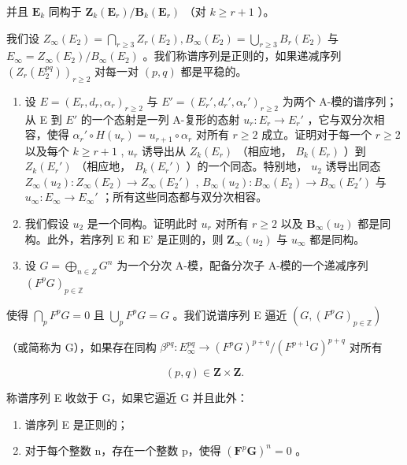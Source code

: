 并且 \(\mathbf{E}_k\) 同构于 \(\mathbf{Z}_k(\mathbf{E}_r) / \mathbf{B}_k(\mathbf{E}_r)\) （对 \(k\geqslant r + 1\) ）。

我们设 \(Z_{\infty}(E_2) = \bigcap_{r \geqslant 3} Z_r(E_2), B_{\infty}(E_2) = \bigcup_{r \geqslant 3} B_r(E_2)\) 与 \(E_{\infty} = Z_{\infty}(E_2)/B_{\infty}(E_2)\) 。我们称谱序列是正则的，如果递减序列 \((Z_r(E_2^{pq}))_{r \geqslant 2}\) 对每一对 \((p, q)\) 都是平稳的。

\begin{enumerate}
\def\labelenumi{\alph{enumi})}
\setcounter{enumi}{1}
\item
  设 \(E = (E_r, d_r, \alpha_r)_{r \geqslant 2}\) 与 \(E' = (E_r', d_r', \alpha_r')_{r \geqslant 2}\) 为两个 A-模的谱序列；从 E 到 \(E'\) 的一个态射是一列 A-复形的态射 \(u_r : E_r \to E_r'\) ，它与双分次相容，使得 \(\alpha_r' \circ H(u_r) = u_{r+1} \circ \alpha_r\) 对所有 \(r \geqslant 2\) 成立。证明对于每一个 \(r \geqslant 2\) 以及每个 \(k \geqslant r + 1\) , \(u_r\) 诱导出从 \(Z_k(E_r)\) （相应地， \(B_k(E_r)\) ）到 \(Z_k(E_r')\) （相应地， \(B_k(E_r')\) ）的一个同态。特别地， \(u_2\) 诱导出同态 \(Z_\infty(u_2) : Z_\infty(E_2) \to Z_\infty(E_2')\) , \(B_\infty(u_2) : B_\infty(E_2) \to B_\infty(E_2')\) 与 \(u_\infty : E_\infty \to E_\infty'\) ；所有这些同态都与双分次相容。
\item
  我们假设 \(u_2\) 是一个同构。证明此时 \(u_r\) 对所有 \(r \geqslant 2\) 以及 \(\mathbf{B}_{\infty}(u_2)\) 都是同构。此外，若序列 E 和 E' 是正则的，则 \(\mathbf{Z}_{\infty}(u_2)\) 与 \(u_{\infty}\) 都是同构。
\item
  设 \(G = \bigoplus_{n \in Z} G^n\) 为一个分次 A-模，配备分次子 A-模的一个递减序列 \((F^p G)_{p \in \mathbb{Z}}\)
\end{enumerate}

使得 \(\bigcap_{p} F^{p} G = 0\) 且 \(\bigcup_{p} F^{p} G = G\) 。我们说谱序列 E 逼近 \((G, (F^{p} G)_{p \in \mathbb{Z}})\)

（或简称为 G），如果存在同构 \(\beta^{pq}: E_{\infty}^{pq} \to (F^p G)^{p+q}/(F^{p+1} G)^{p+q}\) 对所有

\[
(p, q) \in \mathbf {Z} \times \mathbf {Z}.
\]

称谱序列 E 收敛于 G，如果它逼近 G 并且此外：

\begin{enumerate}
\def\labelenumi{(\roman{enumi})}
\item
  谱序列 E 是正则的；
\item
  对于每个整数 n，存在一个整数 p，使得 \((\mathbf{F}^{p}\mathbf{G})^{n}=0\) 。
\end{enumerate}

